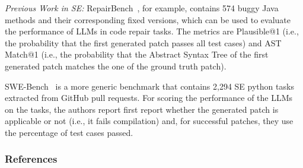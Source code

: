 \documentclass[11pt]{article}
\begin{document}
\emph{Previous Work in SE:} RepairBench~\cite{silva2024repairbench}, for example, contains 574 buggy Java methods and their corresponding fixed versions, which can be used to evaluate the performance of LLMs in code repair tasks.
The metrics are Plausible@1 (i.e., the probability that the first generated patch passes all test cases) and AST Match@1 (i.e., the probability that the Abstract Syntax Tree of the first generated patch matches the one of the ground truth patch).

SWE-Bench~\cite{DBLP:conf/iclr/JimenezYWYPPN24} is a more generic benchmark that contains 2,294 SE python tasks extracted from GitHub pull requests.
For scoring the performance of the LLMs on the tasks, the authors report first report whether the generated patch is applicable or not (i.e., it fails compilation) and, for successful patches, they use the percentage of test cases passed.

\subsubsection{References}



\end{document}
